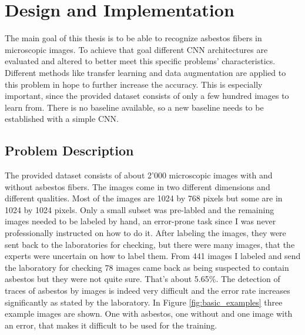 \chapter{Design and Implementation}


The main goal of this thesis is to be able to recognize asbestos fibers in microscopic images. To achieve that goal different CNN architectures are evaluated and altered to better meet this specific problems' characteristics. Different methods like transfer learning and data augmentation are applied to this problem in hope to further increase the accuracy. This is especially important, since the provided dataset consists of only a few hundred images to learn from. There is no baseline available, so a new baseline needs to be established with a simple CNN.

\section{Problem Description}

The provided dataset consists of about 2'000 microscopic images with and without asbestos fibers. The images come in two different dimensions and different qualities. Most of the images are 1024 by 768 pixels but some are in 1024 by 1024 pixels. Only a small subset was pre-labled and the remaining images needed to be labeled by hand, an error-prone task since I was never professionally instructed on how to do it. After labeling the images, they were sent back to the laboratories for checking, but there were many images, that the experts were uncertain on how to label them. From 441 images I labeled and send the laboratory for checking 78 images came back as being suspected to contain asbestos but they were not quite sure. That's about 5.65\%. The detection of traces of asbestos by images is indeed very difficult and the error rate increases significantly as stated by the laboratory. In Figure \ref{fig:basic_examples} three example images are shown. One with asbestos, one without and one image with an error, that makes it difficult to be used for the training.

